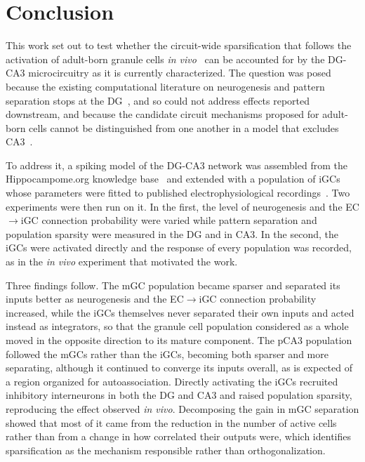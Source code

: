 \chapter{Conclusion}\label{cap:conclusion}

This work set out to test whether the circuit-wide sparsification that follows the activation of adult-born granule cells
\textit{in vivo}~\parencite{mchughAdultborn2022} can be accounted for by the DG-CA3 microcircuitry as it is currently
characterized. The question was posed because the existing computational literature on neurogenesis and pattern separation stops
at the DG~\parencite{chavlisDendrites2017, kimEffect2024, yangDynamic2025}, and so could not address effects reported downstream,
and because the candidate circuit mechanisms proposed for adult-born cells cannot be distinguished from one another in a model
that excludes CA3~\parencite{aimoneComputational2016}.

To address it, a spiking model of the DG-CA3 network was assembled from the Hippocampome.org knowledge
base~\parencite{wheelerHippocampomeorg2023} and extended with a population of iGCs whose parameters were fitted to published
electrophysiological recordings~\parencite{espositoNeuronal2005}. Two experiments were then run on it. In the first, the level of
neurogenesis and the EC$\to$iGC connection probability were varied while pattern separation and population sparsity were measured
in the DG and in CA3. In the second, the iGCs were activated directly and the response of every population was recorded, as in the
\textit{in vivo} experiment that motivated the work.

Three findings follow. The mGC population became sparser and separated its inputs better as neurogenesis and the EC$\to$iGC
connection probability increased, while the iGCs themselves never separated their own inputs and acted instead as integrators, so
that the granule cell population considered as a whole moved in the opposite direction to its mature component. The pCA3
population followed the mGCs rather than the iGCs, becoming both sparser and more separating, although it continued to converge
its inputs overall, as is expected of a region organized for autoassociation. Directly activating the iGCs recruited inhibitory
interneurons in both the DG and CA3 and raised population sparsity, reproducing the effect observed \textit{in vivo}. Decomposing
the gain in mGC separation showed that most of it came from the reduction in the number of active cells rather than from a change
in how correlated their outputs were, which identifies sparsification as the mechanism responsible rather than orthogonalization.

